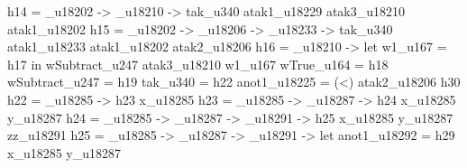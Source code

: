                                                                                                                                                 h14 = _u18202 -> _u18210 -> tak_u340 atak1_u18229 atak3_u18210 atak1_u18202
                                                                                                                                                h15 = _u18202 -> _u18206 -> _u18233 -> tak_u340 atak1_u18233 atak1_u18202 atak2_u18206
                                                                                                                                                h16 = _u18210 -> let
                                                                                                                                                                         w1_u167 = h17
                                                                                                                                                                       in wSubtract_u247 atak3_u18210 w1_u167
                                                                                                                                                wTrue_u164 = h18
                                                                                                                                                wSubtract_u247 = h19
                                                                                                                                                tak_u340 = h22
                                                                                                                                                anot1_u18225 = (<) atak2_u18206 h30
                                                                                                                                                h22 = \x_u18285 -> h23 x_u18285
                                                                                                                                                h23 = \x_u18285 -> \y_u18287 -> h24 x_u18285 y_u18287
                                                                                                                                                h24 = \x_u18285 -> \y_u18287 -> \zz_u18291 -> h25 x_u18285 y_u18287 zz_u18291
                                                                                                                                                h25 = \x_u18285 -> \y_u18287 -> \zz_u18291 -> let
                                                                                                                                                                                                anot1_u18292 = h29 x_u18285 y_u18287
